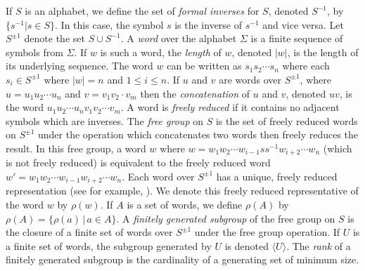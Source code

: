 \documentclass{article}
\newcommand{\gen}[1]{\langle #1 \rangle}
\newcommand{\Spm}{S^{\pm1}}
\begin{document}
If $S$ is an alphabet, we define the set of \emph{formal inverses} for $S$, denoted $S^{-1}$, by $\{ s^{-1} | s \in S \}$.
In this case, the symbol $s$ is the inverse of $s^{-1}$ and vice versa.
Let $\Spm$ denote the set $S \cup S^{-1}$.
A \emph{word} over the alphabet $\Sigma$ is a finite sequence of symbols from $\Sigma$.
If $w$ is such a word, the \emph{length} of $w$, denoted $|w|$, is the length of its underlying sequence.
The word $w$ can be written as $s_1s_2\cdots s_n$ where each $s_i \in \Spm$ where $|w| = n$ and $1 \leq i \leq n$.
If $u$ and $v$ are words over $\Spm$, where $u = u_1 u_2\cdots u_n$ and $v = v_1 v_2 \cdot v_m$ then the \emph{concatenation} of $u$ and $v$, denoted $uv$, is the word $u_1 u_2 \cdots u_n v_1 v_2 \cdots v_m$.
A word is \emph{freely reduced} if it contains no adjacent symbols which are inverses.
The \emph{free group} on $S$ is the set of freely reduced words on $\Spm$ under the operation which concatenates two words then freely reduces the result.
In this free group, a word $w$ where $w = w_1 w_2 \cdots w_{i - 1} s s^{-1} w_{i + 2} \cdots w_n$ (which is not freely reduced) is equivalent to the freely reduced word $w' = w_1 w_2 \cdots w_{i - 1} w_{i + 2} \cdots w_n$.
Each word over $\Spm$ has a unique, freely reduced representation (see for example, \cite[Section~I.1]{ls77}).
We denote this freely reduced representative of the word $w$ by $\rho(w)$.
If $A$ is a set of words, we define $\rho(A)$ by $\rho(A) = \{ \rho(a) \, | \, a \in A\}$.
A \emph{finitely generated subgroup} of the free group on $S$ is the closure of a finite set of words over $\Spm$ under the free group operation.
If $U$ is a finite set of words, the subgroup generated by $U$ is denoted $\gen{U}$.
The \emph{rank} of a finitely generated subgroup is the cardinality of a generating set of minimum size.
\end{document}
